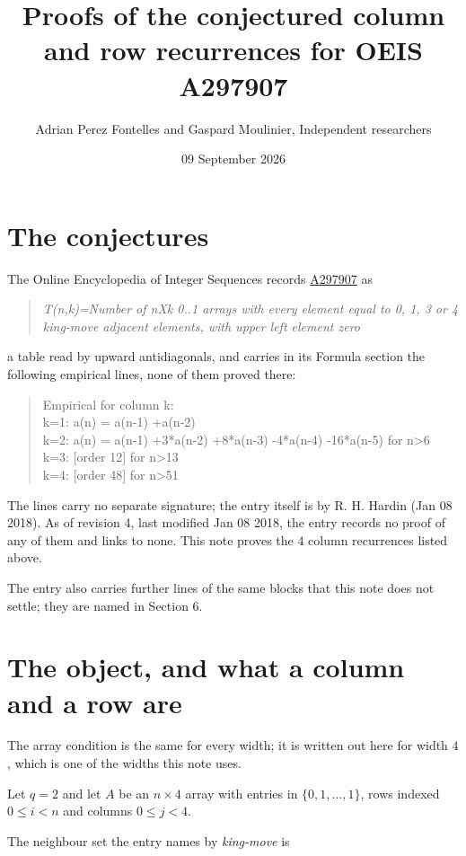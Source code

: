 \documentclass[11pt]{article}
\title{Proofs of the conjectured column and row recurrences for OEIS A297907}
\author{Adrian Perez Fontelles and Gaspard Moulinier, Independent researchers}
\date{09 September 2026}
\theoremstyle{definition}
\begin{document}
\maketitle
\section{The conjectures}

The Online Encyclopedia of Integer Sequences records \href{https://oeis.org/A297907}{A297907} as

\begin{quote}\itshape T(n,k)=Number of nXk 0..1 arrays with every element equal to 0, 1, 3 or 4 king-move adjacent elements, with upper left element zero\end{quote}

a table read by upward antidiagonals, and carries in its Formula section the following empirical lines, none of them proved there:

\begin{quote}\ttfamily Empirical for column k:\\
k=1: a(n) = a(n-1) +a(n-2)\\k=2: a(n) = a(n-1) +3*a(n-2) +8*a(n-3) -4*a(n-4) -16*a(n-5) for n>6\\k=3: [order 12] for n>13\\k=4: [order 48] for n>51\end{quote}

The lines carry no separate signature; the entry itself is by R. H. Hardin (Jan 08 2018). As of revision 4, last modified Jan 08 2018, the entry records no proof of any of them and links to none. This note proves the 4 column recurrences listed above.

The entry also carries further lines of the same blocks that this note does not settle; they are named in Section 6.

\section{The object, and what a column and a row are}

The array condition is the same for every width; it is written out here for width $4$, which is one of the widths this note uses.

Let $q = 2$ and let $A$ be an $n \times 4$ array with entries in $\{0,1,\dots,1\}$, rows indexed $0 \le i < n$ and columns $0 \le j < 4$.

The neighbour set the entry names by {\itshape king-move} is
\end{document}
